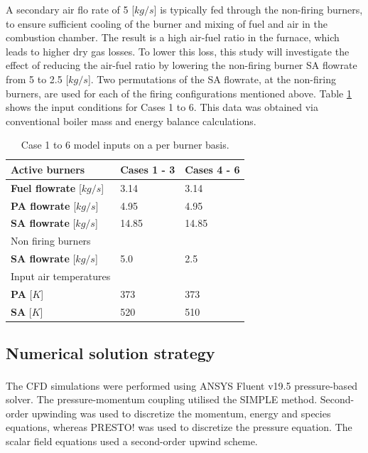\documentclass[review]{elsarticle}
\begin{document}
A secondary air flo rate of 5 [$kg/s$] is typically fed through the non-firing burners, to ensure sufficient cooling of the burner and mixing of fuel and air in the combustion chamber. The result is a high air-fuel ratio in the furnace, which leads to higher dry gas losses. To lower this loss, this study will investigate the effect of reducing the air-fuel ratio by lowering the non-firing burner SA flowrate from 5 to 2.5 [$kg/s$]. Two permutations of the SA flowrate, at the non-firing burners, are used for each of the firing configurations mentioned above. Table \ref{tbl_case_inputs} shows the input conditions for Cases 1 to 6. This data was obtained via conventional boiler mass and energy balance calculations.

\begin{table}[h!]
\centering
\caption{Case 1 to 6 model inputs on a per burner basis.}
\label{tbl_case_inputs}
\vspace{2mm}
{\tabulinesep=1.2mm
\begin{tabularx}{\textwidth}{p{} p{} l}
\hline
Active burners & \textbf{Cases 1 - 3} & \textbf{Cases 4 - 6}\\
\hline
\textbf{Fuel flowrate} [$kg/s$]&3.14  &3.14\\
\textbf{PA flowrate} [$kg/s$]&4.95  &4.95\\
\textbf{SA flowrate} [$kg/s$]&14.85  &14.85\\
\hline
Non firing burners &  & \\
\hline
\textbf{SA flowrate} [$kg/s$]&5.0  &2.5\\
\hline
Input air temperatures& &\\
\hline
\textbf{PA} [$K$]&373  &373\\
\textbf{SA} [$K$]&520  &510\\
\hline
\end{tabularx}}
\end{table}

\subsection{Numerical solution strategy} 
The CFD simulations were performed using ANSYS Fluent v19.5\textsuperscript{\textregistered} pressure-based solver. The pressure-momentum coupling utilised the SIMPLE method. Second-order upwinding was used to discretize the momentum, energy and species equations, whereas PRESTO! was used to discretize the pressure equation. The scalar field equations used a second-order upwind scheme.
\end{document}
